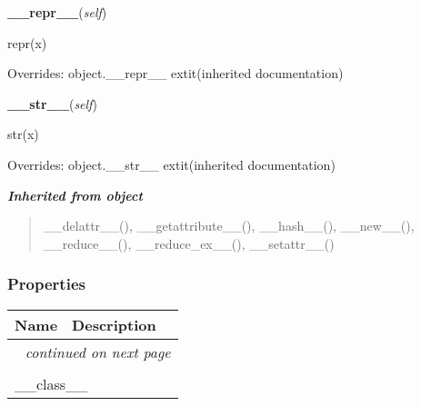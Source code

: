     \vspace{0.5ex}

\hspace{.8\funcindent}\begin{boxedminipage}{\funcwidth}

    \raggedright \textbf{\_\_repr\_\_}(\textit{self})

\setlength{\parskip}{2ex}
    repr(x)

\setlength{\parskip}{1ex}
      Overrides: object.\_\_repr\_\_ 	extit{(inherited documentation)}

    \end{boxedminipage}

    \vspace{0.5ex}

\hspace{.8\funcindent}\begin{boxedminipage}{\funcwidth}

    \raggedright \textbf{\_\_str\_\_}(\textit{self})

\setlength{\parskip}{2ex}
    str(x)

\setlength{\parskip}{1ex}
      Overrides: object.\_\_str\_\_ 	extit{(inherited documentation)}

    \end{boxedminipage}


\large{\textbf{\textit{Inherited from object}}}

\begin{quote}
\_\_delattr\_\_(), \_\_getattribute\_\_(), \_\_hash\_\_(), \_\_new\_\_(), \_\_reduce\_\_(), \_\_reduce\_ex\_\_(), \_\_setattr\_\_()
\end{quote}


  \subsubsection{Properties}

    \vspace{-1cm}
\hspace{\varindent}\begin{longtable}{|p{\varnamewidth}|p{\vardescrwidth}|l}
\cline{1-2}
\cline{1-2} \centering \textbf{Name} & \centering \textbf{Description}& \\
\cline{1-2}
\endhead\cline{1-2}\multicolumn{3}{r}{\small\textit{continued on next page}}\\\endfoot\cline{1-2}
\endlastfoot\multicolumn{2}{|l|}{\textit{Inherited from object}}\\
\multicolumn{2}{|p{\varwidth}|}{\raggedright \_\_class\_\_}\\
\cline{1-2}
\end{longtable}

